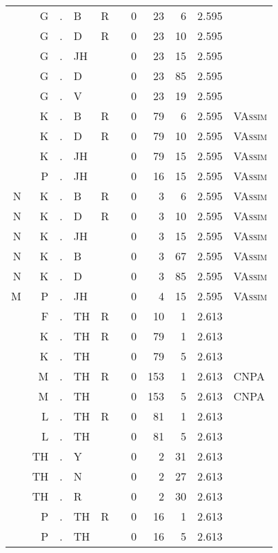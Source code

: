 \begin{longtable}{r@{ } r@{ } c@{ } l@{ } l@{ } l@{ } r r r r l }
  & G & . & B & R &   & 0 & 23 & 6 & 2.595 &  \\
  & G & . & D & R &   & 0 & 23 & 10 & 2.595 &  \\
  & G & . & JH &   &   & 0 & 23 & 15 & 2.595 &  \\
  & G & . & D &   &   & 0 & 23 & 85 & 2.595 &  \\
  & G & . & V &   &   & 0 & 23 & 19 & 2.595 &  \\
  & K & . & B & R &   & 0 & 79 & 6 & 2.595 & \textsc{VAssim} \\
  & K & . & D & R &   & 0 & 79 & 10 & 2.595 & \textsc{VAssim} \\
  & K & . & JH &   &   & 0 & 79 & 15 & 2.595 & \textsc{VAssim} \\
  & P & . & JH &   &   & 0 & 16 & 15 & 2.595 & \textsc{VAssim} \\
N & K & . & B & R &   & 0 & 3 & 6 & 2.595 & \textsc{VAssim} \\
N & K & . & D & R &   & 0 & 3 & 10 & 2.595 & \textsc{VAssim} \\
N & K & . & JH &   &   & 0 & 3 & 15 & 2.595 & \textsc{VAssim} \\
N & K & . & B &   &   & 0 & 3 & 67 & 2.595 & \textsc{VAssim} \\
N & K & . & D &   &   & 0 & 3 & 85 & 2.595 & \textsc{VAssim} \\
M & P & . & JH &   &   & 0 & 4 & 15 & 2.595 & \textsc{VAssim} \\
  & F & . & TH & R &   & 0 & 10 & 1 & 2.613 &  \\
  & K & . & TH & R &   & 0 & 79 & 1 & 2.613 &  \\
  & K & . & TH &   &   & 0 & 79 & 5 & 2.613 &  \\
  & M & . & TH & R &   & 0 & 153 & 1 & 2.613 & \textsc{CNPA} \\
  & M & . & TH &   &   & 0 & 153 & 5 & 2.613 & \textsc{CNPA} \\
  & L & . & TH & R &   & 0 & 81 & 1 & 2.613 &  \\
  & L & . & TH &   &   & 0 & 81 & 5 & 2.613 &  \\
  & TH & . & Y &   &   & 0 & 2 & 31 & 2.613 &  \\
  & TH & . & N &   &   & 0 & 2 & 27 & 2.613 &  \\
  & TH & . & R &   &   & 0 & 2 & 30 & 2.613 &  \\
  & P & . & TH & R &   & 0 & 16 & 1 & 2.613 &  \\
  & P & . & TH &   &   & 0 & 16 & 5 & 2.613 &  \\

\end{longtable}
